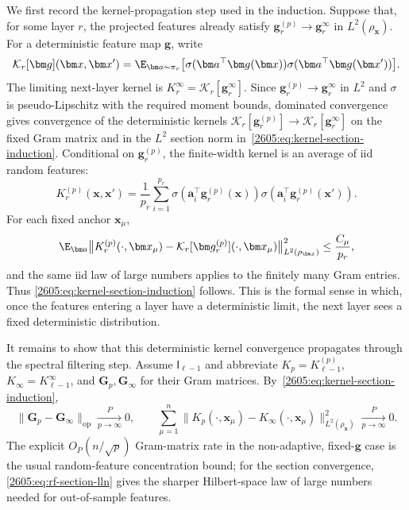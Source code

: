 We first record the kernel-propagation step used in the induction. Suppose that, for some
layer $r$, the projected features already satisfy
$\bm g_r^{(p)}\to\bm g_r^\infty$ in $L^2(\rho_{\bm x})$. For a deterministic feature map
$\bm g$, write
\[
    \mathcal K_r[\bm g](\bm x,\bm x')
    =
    \E_{\bm a\sim\pi_r}
    \bigl[
        \sigma(\bm a^\top \bm g(\bm x))
        \sigma(\bm a^\top \bm g(\bm x'))
    \bigr].
\]
The limiting next-layer kernel is
$K_r^\infty=\mathcal K_r[\bm g_r^\infty]$. Since $\bm g_r^{(p)}\to \bm g_r^\infty$ in
$L^2$ and $\sigma$ is pseudo-Lipschitz with the required moment bounds, dominated
convergence gives convergence of the deterministic kernels
$\mathcal K_r[\bm g_r^{(p)}]\to \mathcal K_r[\bm g_r^\infty]$ on the fixed Gram matrix
and in the $L^2$ section norm in~\eqref{2605:eq:kernel-section-induction}. Conditional on
$\bm g_r^{(p)}$, the finite-width kernel is an average of iid random features:
\[
    K_r^{(p)}(\bm x,\bm x')
    =
    \frac1{p_r}\sum_{i=1}^{p_r}
    \sigma(\bm a_i^\top \bm g_r^{(p)}(\bm x))
    \sigma(\bm a_i^\top \bm g_r^{(p)}(\bm x')).
\]
For each fixed anchor $\bm x_\mu$,
\begin{equation}
    \E_{\bm a}
    \bigl\|
        K_r^{(p)}(\cdot,\bm x_\mu)
        -\mathcal K_r[\bm g_r^{(p)}](\cdot,\bm x_\mu)
    \bigr\|_{L^2(\rho_{\bm x})}^2
    \leq \frac{C_\mu}{p_r},
    \label{2605:eq:rf-section-lln}
\end{equation}
and the same iid law of large numbers applies to the finitely many Gram entries. Thus
\eqref{2605:eq:kernel-section-induction} follows. This is the formal sense in which, once the
features entering a layer have a deterministic limit, the next layer sees a fixed
deterministic distribution.

It remains to show that this deterministic kernel convergence propagates through the
spectral filtering step. Assume $\mathsf I_{\ell-1}$ and abbreviate
$K_p=K_{\ell-1}^{(p)}$, $K_\infty=K_{\ell-1}^\infty$, and
$\bm G_p,\bm G_\infty$ for their Gram matrices. By~\eqref{2605:eq:kernel-section-induction},
\begin{equation}
    \|\bm G_p-\bm G_\infty\|_{\mathrm{op}}\xrightarrow[p\to\infty]{P}0,\qquad
    \sum_{\mu=1}^n
    \|K_p(\cdot,\bm x_\mu)-K_\infty(\cdot,\bm x_\mu)\|_{L^2(\rho_{\bm x})}^2
    \xrightarrow[p\to\infty]{P}0.
    \label{2605:eq:gram-and-section-conv}
\end{equation}
The explicit $O_P(n/\sqrt p)$ Gram-matrix rate in the non-adaptive, fixed-$\bm g$
case is the usual random-feature concentration bound; for the section convergence,
\eqref{2605:eq:rf-section-lln} gives the sharper Hilbert-space law of large numbers needed for
out-of-sample features.


